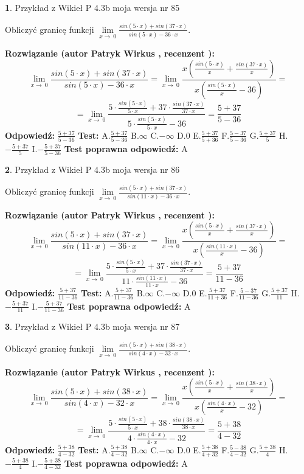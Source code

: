 \documentclass[12pt, a4paper]{article}
\theoremstyle{definition} %
\newtheorem{zad}{}
\newcommand{\zadStart}[1]{\begin{zad}#1\newline}
\newcommand{\zadStop}{\end{zad}}
\newcommand{\rozwStart}[2]{\noindent \textbf{Rozwiązanie (autor #1 , recenzent #2): }\newline}
\newcommand{\rozwStop}{\newline}
\newcommand{\odpStart}{\noindent \textbf{Odpowiedź:}\newline}
\newcommand{\odpStop}{\newline}
\newcommand{\testStart}{\noindent \textbf{Test:}\newline}
\newcommand{\testStop}{\newline}
\newcommand{\kluczStart}{\noindent \textbf{Test poprawna odpowiedź:}\newline}
\newcommand{\kluczStop}{\newline}
\begin{document}
\zadStart{Przykład z Wikieł P 4.3b moja wersja nr 85}


Obliczyć granicę funkcji $\lim\limits_{x\to\ 0}\frac{sin(5 \cdot x)+sin(37 \cdot x)}{sin(5 \cdot x)-36 \cdot x}$.
\zadStop
\rozwStart{Patryk Wirkus}{}
$$\lim\limits_{x\to\ 0}\frac{sin(5 \cdot x)+sin(37 \cdot x)}{sin(5 \cdot x)-36 \cdot x}=\lim\limits_{x\to\ 0}\frac{x(\frac{sin(5 \cdot x)}{x}+\frac{sin(37 \cdot x)}{x})}{x(\frac{sin(5 \cdot x)}{x}-36)}=$$
$$=\lim\limits_{x\to\ 0}\frac{5 \cdot \frac{sin(5 \cdot x)}{5 \cdot x}+37 \cdot \frac{sin(37 \cdot x)}{37 \cdot x}}{5 \cdot \frac{sin(5 \cdot x)}{5 \cdot x}-36}=\frac{5+37}{5-36}$$
\rozwStop
\odpStart
$\frac{5+37}{5-36}$
\odpStop
\testStart
A.$\frac{5+37}{5-36}$
B.$\infty$
C.$-\infty$
D.$0$
E.$\frac{5+37}{5+36}$
F.$\frac{5-37}{5-36}$
G.$\frac{5+37}{5}$
H.$-\frac{5+37}{5}$
I.$-\frac{5+37}{5-36}$
\testStop
\kluczStart
A
\kluczStop



\zadStart{Przykład z Wikieł P 4.3b moja wersja nr 86}


Obliczyć granicę funkcji $\lim\limits_{x\to\ 0}\frac{sin(5 \cdot x)+sin(37 \cdot x)}{sin(11 \cdot x)-36 \cdot x}$.
\zadStop
\rozwStart{Patryk Wirkus}{}
$$\lim\limits_{x\to\ 0}\frac{sin(5 \cdot x)+sin(37 \cdot x)}{sin(11 \cdot x)-36 \cdot x}=\lim\limits_{x\to\ 0}\frac{x(\frac{sin(5 \cdot x)}{x}+\frac{sin(37 \cdot x)}{x})}{x(\frac{sin(11 \cdot x)}{x}-36)}=$$
$$=\lim\limits_{x\to\ 0}\frac{5 \cdot \frac{sin(5 \cdot x)}{5 \cdot x}+37 \cdot \frac{sin(37 \cdot x)}{37 \cdot x}}{11 \cdot \frac{sin(11 \cdot x)}{11 \cdot x}-36}=\frac{5+37}{11-36}$$
\rozwStop
\odpStart
$\frac{5+37}{11-36}$
\odpStop
\testStart
A.$\frac{5+37}{11-36}$
B.$\infty$
C.$-\infty$
D.$0$
E.$\frac{5+37}{11+36}$
F.$\frac{5-37}{11-36}$
G.$\frac{5+37}{11}$
H.$-\frac{5+37}{11}$
I.$-\frac{5+37}{11-36}$
\testStop
\kluczStart
A
\kluczStop



\zadStart{Przykład z Wikieł P 4.3b moja wersja nr 87}


Obliczyć granicę funkcji $\lim\limits_{x\to\ 0}\frac{sin(5 \cdot x)+sin(38 \cdot x)}{sin(4 \cdot x)-32 \cdot x}$.
\zadStop
\rozwStart{Patryk Wirkus}{}
$$\lim\limits_{x\to\ 0}\frac{sin(5 \cdot x)+sin(38 \cdot x)}{sin(4 \cdot x)-32 \cdot x}=\lim\limits_{x\to\ 0}\frac{x(\frac{sin(5 \cdot x)}{x}+\frac{sin(38 \cdot x)}{x})}{x(\frac{sin(4 \cdot x)}{x}-32)}=$$
$$=\lim\limits_{x\to\ 0}\frac{5 \cdot \frac{sin(5 \cdot x)}{5 \cdot x}+38 \cdot \frac{sin(38 \cdot x)}{38 \cdot x}}{4 \cdot \frac{sin(4 \cdot x)}{4 \cdot x}-32}=\frac{5+38}{4-32}$$
\rozwStop
\odpStart
$\frac{5+38}{4-32}$
\odpStop
\testStart
A.$\frac{5+38}{4-32}$
B.$\infty$
C.$-\infty$
D.$0$
E.$\frac{5+38}{4+32}$
F.$\frac{5-38}{4-32}$
G.$\frac{5+38}{4}$
H.$-\frac{5+38}{4}$
I.$-\frac{5+38}{4-32}$
\testStop
\kluczStart
A
\kluczStop
\end{document}
